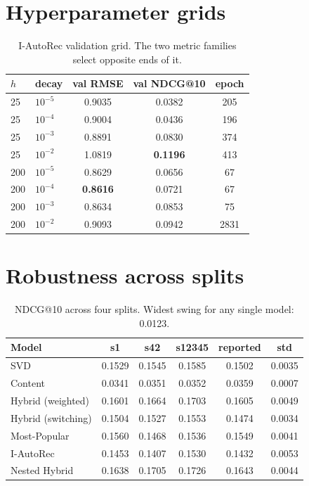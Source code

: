 \documentclass[10pt,twocolumn,letterpaper]{article}
\newif\ifdraftnotes
\newcommand{\TODO}[1]{\ifdraftnotes
  \par\noindent\fcolorbox{orange!60}{yellow!12}{%
    \parbox{0.95\linewidth}{\footnotesize\textbf{TODO}\ \textit{#1}}}\par\medskip
\fi}
\begin{document}
\section{Hyperparameter grids}\label{app:grids}
\begin{table}[h]\centering\small
\begin{tabular}{llccc}
\toprule
$h$ & decay & val RMSE & val NDCG@10 & epoch \\
\midrule
25  & $10^{-5}$ & 0.9035 & 0.0382 & 205 \\
25  & $10^{-4}$ & 0.9004 & 0.0436 & 196 \\
25  & $10^{-3}$ & 0.8891 & 0.0830 & 374 \\
25  & $10^{-2}$ & 1.0819 & \textbf{0.1196} & 413 \\
200 & $10^{-5}$ & 0.8629 & 0.0656 & 67 \\
200 & $10^{-4}$ & \textbf{0.8616} & 0.0721 & 67 \\
200 & $10^{-3}$ & 0.8634 & 0.0853 & 75 \\
200 & $10^{-2}$ & 0.9093 & 0.0942 & 2831 \\
\bottomrule
\end{tabular}
\caption{I-AutoRec validation grid. The two metric families select opposite
ends of it.}
\label{tab:autogrid}
\end{table}

\TODO{Add the SVD $k \times$ damping grid and the $\alpha$ sweep table here
from notebook Steps 2 and 7. Both already print as tables in the notebook.}

\section{Robustness across splits}\label{app:seeds}
\begin{table}[h]\centering\footnotesize
\begin{tabular}{lccccc}
\toprule
Model & s1 & s42 & s12345 & reported & std \\
\midrule
SVD                & 0.1529 & 0.1545 & 0.1585 & 0.1502 & 0.0035 \\
Content            & 0.0341 & 0.0351 & 0.0352 & 0.0359 & 0.0007 \\
Hybrid (weighted)  & 0.1601 & 0.1664 & 0.1703 & 0.1605 & 0.0049 \\
Hybrid (switching) & 0.1504 & 0.1527 & 0.1553 & 0.1474 & 0.0034 \\
Most-Popular       & 0.1560 & 0.1468 & 0.1536 & 0.1549 & 0.0041 \\
I-AutoRec          & 0.1453 & 0.1407 & 0.1530 & 0.1432 & 0.0053 \\
Nested Hybrid      & 0.1638 & 0.1705 & 0.1726 & 0.1643 & 0.0044 \\
\bottomrule
\end{tabular}
\caption{NDCG@10 across four splits. Widest swing for any single model:
0.0123.}
\label{tab:seeds}
\end{table}
\end{document}
